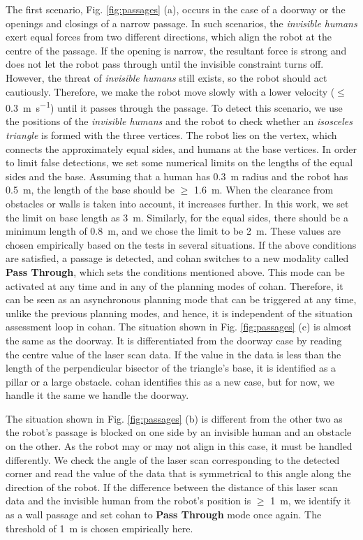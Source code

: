 The first scenario, Fig. \ref{fig:passages} (a), occurs in the case of a doorway or the openings and closings of a narrow passage. In such scenarios, the \textit{invisible humans} exert equal forces from two different directions, which align the robot at the centre of the passage. If the opening is narrow, the resultant force is strong and does not let the robot pass through until the invisible constraint turns off. However, the threat of \textit{invisible humans} still exists, so the robot should act cautiously. Therefore, we make the robot move slowly with a lower velocity ($\leq$ \SI{0.3}{\meter\per\second}) until it passes through the passage. To detect this scenario, we use the positions of the \textit{invisible humans} and the robot to check whether an \textit{isosceles triangle} is formed with the three vertices. The robot lies on the vertex, which connects the approximately equal sides, and humans at the base vertices. In order to limit false detections, we set some numerical limits on the lengths of the equal sides and the base. Assuming that a human has \SI{0.3}{\meter} radius and the robot has \SI{0.5}{\meter}, the length of the base should be $\geq$ \SI{1.6}{\meter}. When the clearance from obstacles or walls is taken into account, it increases further. In this work, we set the limit on base length as \SI{3}{\meter}. Similarly, for the equal sides, there should be a minimum length of \SI{0.8}{\meter}, and we chose the limit to be \SI{2}{\meter}. These values are chosen empirically based on the tests in several situations. If the above conditions are satisfied, a passage is detected, and \acrshort{cohan} switches to a new modality called \textbf{Pass Through}, which sets the conditions mentioned above. This mode can be activated at any time and in any of the planning modes of \acrshort{cohan}. Therefore, it can be seen as an asynchronous planning mode that can be triggered at any time, unlike the previous planning modes, and hence, it is independent of the situation assessment loop in \acrshort{cohan}. The situation shown in Fig. \ref{fig:passages} (c) is almost the same as the doorway. It is differentiated from the doorway case by reading the centre value of the laser scan data. If the value in the data is less than the length of the perpendicular bisector of the triangle's base, it is identified as a pillar or a large obstacle. \acrshort{cohan} identifies this as a new case, but for now, we handle it the same we handle the doorway.

The situation shown in Fig. \ref{fig:passages} (b) is different from the other two as the robot's passage is blocked on one side by an invisible human and an obstacle on the other. As the robot may or may not align in this case, it must be handled differently. We check the angle of the laser scan corresponding to the detected corner and read the value of the data that is symmetrical to this angle along the direction of the robot. If the difference between the distance of this laser scan data and the invisible human from the robot's position is $\geq$ \SI{1}{\meter}, we identify it as a wall passage and set \acrshort{cohan} to \textbf{Pass Through} mode once again. The threshold of \SI{1}{\meter} is chosen empirically here.


